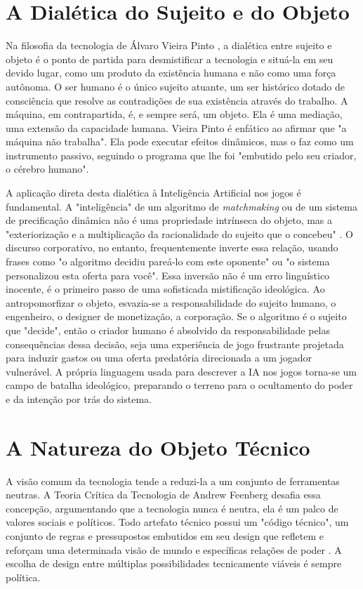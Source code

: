 \section{A Dialética do Sujeito e do Objeto}\label{sec:dialetica}

Na filosofia da tecnologia de Álvaro Vieira Pinto \cite{VieiraPinto2005}, a dialética entre sujeito e objeto é o ponto de partida para desmistificar a 
tecnologia e situá-la em seu devido lugar, como um produto da existência humana e não como uma força autônoma. O ser humano é o 
único sujeito atuante, um ser histórico dotado de consciência que resolve as contradições de sua existência através do trabalho. 
A máquina, em contrapartida, é, e sempre será, um objeto. Ela é uma mediação, uma extensão da capacidade humana. Vieira Pinto é 
enfático ao afirmar que "a máquina não trabalha". Ela pode executar efeitos dinâmicos, mas o faz como um instrumento passivo, 
seguindo o programa que lhe foi "embutido pelo seu criador, o cérebro humano".

A aplicação direta desta dialética à Inteligência Artificial nos jogos é fundamental. A "inteligência" de um algoritmo de 
\textit{matchmaking} ou de um sistema de precificação dinâmica não é uma propriedade intrínseca do objeto, mas a "exteriorização e a 
multiplicação da racionalidade do sujeito que o concebeu" \cite{VieiraPinto2005}. O discurso corporativo, no entanto, frequentemente inverte essa relação, 
usando frases como "o algoritmo decidiu pareá-lo com este oponente" ou "o sistema personalizou esta oferta para você". Essa inversão 
não é um erro linguístico inocente, é o primeiro passo de uma sofisticada mistificação ideológica. Ao antropomorfizar o objeto, 
esvazia-se a responsabilidade do sujeito humano, o engenheiro, o designer de monetização, a corporação. Se o algoritmo é o sujeito 
que "decide", então o criador humano é absolvido da responsabilidade pelas consequências dessa decisão, seja uma experiência de jogo 
frustrante projetada para induzir gastos ou uma oferta predatória direcionada a um jogador vulnerável. A própria linguagem usada para 
descrever a IA nos jogos torna-se um campo de batalha ideológico, preparando o terreno para o ocultamento do poder e da intenção por 
trás do sistema.

\section{A Natureza do Objeto Técnico}\label{sec:natureza_obj_tec}

A visão comum da tecnologia tende a reduzi-la a um conjunto de ferramentas neutras. A Teoria Crítica da Tecnologia de Andrew Feenberg \cite{Feenberg1999}
desafia essa concepção, argumentando que a tecnologia nunca é neutra, ela é um palco de valores sociais e políticos. Todo artefato 
técnico possui um "código técnico", um conjunto de regras e pressupostos embutidos em seu design que refletem e reforçam uma 
determinada visão de mundo e específicas relações de poder \cite{Feenberg2002Transforming}. A escolha de design entre múltiplas possibilidades tecnicamente viáveis é 
sempre política.

